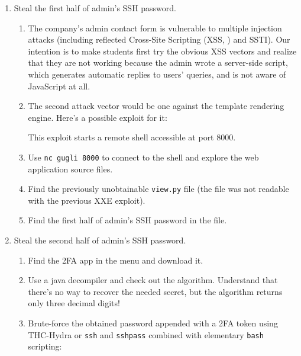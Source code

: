 \documentclass[11pt, a4paper]{article}
\begin{document}
\begin{enumerate}
      \item Steal the first half of admin's SSH password.
        \begin{enumerate}
          \item The company's admin contact form is vulnerable to multiple
            injection attacks (including reflected Cross-Site Scripting (XSS, \citep{xss}) and SSTI). Our intention
            is to make students first try the obvious XSS vectors and realize
            that they are not working because the admin wrote a server-side script,
            which generates automatic replies to users' queries, and is not aware of
            JavaScript at all.
          \item The second attack vector would be one against the template
            rendering engine. Here's a possible exploit for it:
            
            This exploit starts a remote shell accessible at port 8000.
          \item Use \texttt{nc gugli 8000} to connect to the shell and explore the web application
            source files.
          \item Find the previously unobtainable \texttt{view.py} file
           (the file was not readable with the previous XXE exploit).
          \item Find the first half of admin's SSH password in the file.
        \end{enumerate}

      \item Steal the second half of admin's SSH password.
        \begin{enumerate}
          \item Find the 2FA app in the menu and download it.
          \item Use a java decompiler and check out the algorithm.
            Understand that there's no way to recover the needed secret, but
            the algorithm returns only three decimal digits!
          \item Brute-force the obtained password appended with a 2FA token
            using THC-Hydra or \texttt{ssh} and \texttt{sshpass} combined with elementary \texttt{bash} scripting: 
        \end{enumerate}


\end{enumerate}
\end{document}
